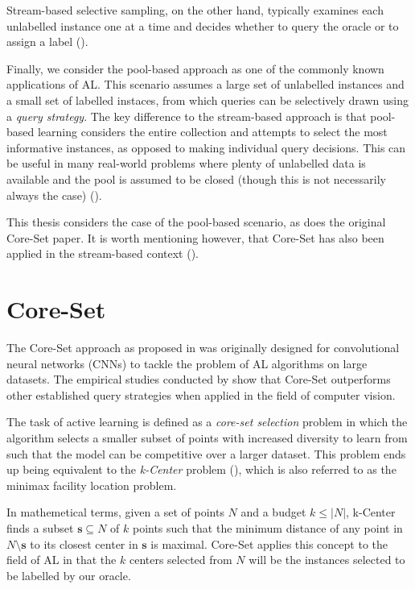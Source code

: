 \documentclass[english,bachelor,ul]{webisthesis} %
\begin{document}
Stream-based selective sampling, on the other hand, typically examines each unlabelled instance one at a time and decides whether to query the oracle or to assign a label (\cite{settles.tr09}).

Finally, we consider the pool-based approach as one of the commonly known applications of AL. This scenario assumes a large set of unlabelled instances and a small set of labelled instaces, from which queries can be selectively drawn using a \textit{query strategy}. The key difference to the stream-based approach is that pool-based learning considers the entire collection and attempts to select the most informative instances, as opposed to making individual query decisions. This can be useful in many real-world problems where plenty of unlabelled data is available and the pool is assumed to be closed (though this is not necessarily always the case) (\cite{settles.tr09}).

This thesis considers the case of the pool-based scenario, as does the original Core-Set paper. It is worth mentioning however, that Core-Set has also been applied in the stream-based context (\cite{DBLP:conf/icml/SaranYK0A23}).

\section{Core-Set}

The Core-Set approach as proposed in \cite{DBLP:conf/iclr/SenerS18} was originally designed for convolutional neural networks (CNNs) to tackle the problem of AL algorithms on large datasets. The empirical studies conducted by \cite{DBLP:conf/iclr/SenerS18} show that Core-Set outperforms other established query strategies when applied in the field of computer vision.

The task of active learning is defined as a \textit{core-set selection} problem in which the algorithm selects a smaller subset of points with increased diversity to learn from such that the model can be competitive over a larger dataset. This problem ends up being equivalent to the \textit{k-Center} problem (\cite{DBLP:conf/iclr/SenerS18}), which is also referred to as the minimax facility location problem. 

In mathemetical terms, given a set of points $ N $ and a budget $ k \leq |N| $, k-Center finds a subset $ \mathbf{s} \subseteq N $ of $ k $ points such that the minimum distance of any point in $ N \setminus \mathbf{s} $ to its closest center in $ \mathbf{s} $ is maximal. Core-Set applies this concept to the field of AL in that the $ k $ centers selected from $ N $ will be the instances selected to be labelled by our oracle.
\end{document}
